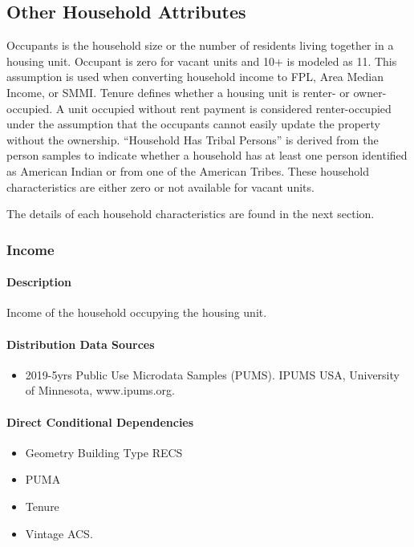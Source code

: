 \subsection{Other Household Attributes}
Occupants is the household size or the number of residents living together in a housing unit. Occupant is zero for vacant units and 10+ is modeled as 11. This assumption is used when converting household income to FPL, Area Median Income, or SMMI. Tenure defines whether a housing unit is renter- or owner-occupied. A unit occupied without rent payment is considered renter-occupied under the assumption that the occupants cannot easily update the property without the ownership. ``Household Has Tribal Persons'' is derived from the person samples to indicate whether a household has at least one person identified as American Indian or from one of the American Tribes. These household characteristics are either zero or not available for vacant units.

The details of each household characteristics are found in the next section.

\subsubsection{Income}\label{income}
\paragraph{Description}
Income of the household occupying the housing unit.

\paragraph{Distribution Data Sources}
\begin{itemize}
\item
  2019-5yrs Public Use Microdata Samples (PUMS). IPUMS USA, University
  of Minnesota, www.ipums.org.
\end{itemize}

\paragraph{Direct Conditional Dependencies}
\begin{itemize}
    \item Geometry Building Type RECS
    \item PUMA
    \item Tenure
    \item Vintage ACS.
\end{itemize}

